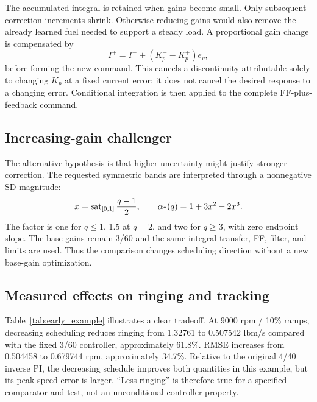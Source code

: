 The accumulated integral is retained when gains become small. Only subsequent correction increments shrink. Otherwise reducing gains would also remove the already learned fuel needed to support a steady load. A proportional gain change is compensated by
\begin{equation}
I^{+}=I^{-}+(K_p^{-}-K_p^{+})e_v,
\end{equation}
before forming the new command. This cancels a discontinuity attributable solely to changing $K_p$ at a fixed current error; it does not cancel the desired response to a changing error. Conditional integration is then applied to the complete FF-plus-feedback command.

\subsection{Increasing-gain challenger}
The alternative hypothesis is that higher uncertainty might justify stronger correction. The requested symmetric bands are interpreted through a nonnegative SD magnitude:
\begin{equation}
x=\operatorname{sat}_{[0,1]}\frac{q-1}{2},\qquad
\alpha_\uparrow(q)=1+3x^2-2x^3.
\label{eq:up}
\end{equation}
The factor is one for $q\leq1$, 1.5 at $q=2$, and two for $q\geq3$, with zero endpoint slope. The base gains remain 3/60 and the same integral transfer, FF, filter, and limits are used. Thus the comparison changes scheduling direction without a new base-gain optimization.


\subsection{Measured effects on ringing and tracking}

Table~\ref{tab:early_example} illustrates a clear tradeoff. At 9000 rpm / 10\% ramps, decreasing scheduling reduces ringing from 1.32761 to 0.507542 lbm/s compared with the fixed 3/60 controller, approximately 61.8\%. RMSE increases from 0.504458 to 0.679744 rpm, approximately 34.7\%. Relative to the original 4/40 inverse PI, the decreasing schedule improves both quantities in this example, but its peak speed error is larger. ``Less ringing'' is therefore true for a specified comparator and test, not an unconditional controller property.

